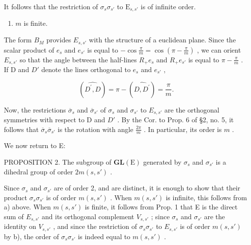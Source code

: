 It follows that the restriction of \(\sigma_s\sigma_{s'}\) to \(\mathrm{E}_{s,s'}\) is of infinite order.

\begin{enumerate}
\def\labelenumi{\alph{enumi})}
\setcounter{enumi}{1}
\tightlist
\item
  \(m\) is finite.
\end{enumerate}

The form \(B_{M}\) provides \(E_{s,s'}\) with the structure of a euclidean plane. Since the scalar product of \(e_{s}\) and \(e_{s'}\) is equal to \(-\cos\frac{\pi}{m}=\cos\left(\pi-\frac{\pi}{m}\right)\) , we can orient \(E_{s,s'}\) so that the angle between the half-lines \(R_{+}e_{s}\) and \(R_{+}e_{s'}\) is equal to \(\pi-\frac{\pi}{m}\) . If D and \(D'\) denote the lines orthogonal to \(e_{s}\) and \(e_{s'}\) ,

\[
(\widehat {D ^ {\prime} , D}) = \pi - (\widehat {D , D ^ {\prime}}) = \frac {\pi}{m}.
\]

Now, the restrictions \(\overline{\sigma}_s\) and \(\overline{\sigma}_{s'}\) of \(\sigma_s\) and \(\sigma_{s'}\) to \(E_{s,s'}\) are the orthogonal symmetries with respect to D and \(D'\) . By the Cor. to Prop. 6 of §2, no. 5, it follows that \(\overline{\sigma}_s\overline{\sigma}_{s'}\) is the rotation with angle \(\frac{2\pi}{m}\) . In particular, its order is \(m\) .

We now return to E:

PROPOSITION 2. The subgroup of \(\mathbf{GL}(\mathrm{E})\) generated by \(\sigma_s\) and \(\sigma_{s'}\) is a dihedral group of order \(2m(s,s')\) .

Since \(\sigma_s\) and \(\sigma_{s'}\) are of order 2, and are distinct, it is enough to show that their product \(\sigma_s\sigma_{s'}\) is of order \(m(s,s')\) . When \(m(s,s')\) is infinite, this follows from a) above. When \(m(s, s')\) is finite, it follows from Prop. 1 that E is the direct sum of \(E_{s,s'}\) and its orthogonal complement \(V_{s,s'}\) ; since \(\sigma_s\) and \(\sigma_{s'}\) are the identity on \(V_{s,s'}\) , and since the restriction of \(\sigma_s\sigma_{s'}\) to \(E_{s,s'}\) is of order \(m(s, s')\) by b), the order of \(\sigma_s\sigma_{s'}\) is indeed equal to \(m(s, s')\) .

